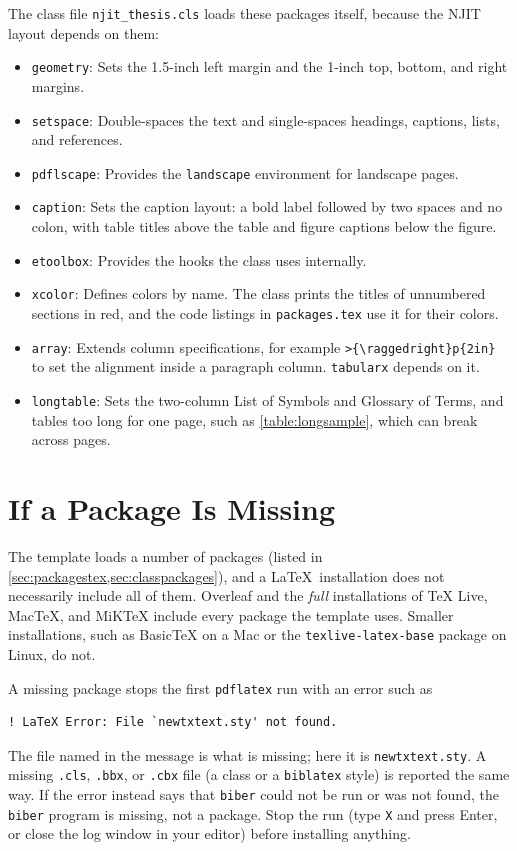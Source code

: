 The class file \texttt{njit\_thesis.cls} loads these packages itself, because the NJIT layout depends on them:
\begin{itemize}
\item \texttt{geometry}: Sets the 1.5-inch left margin and the 1-inch top, bottom, and right margins.
\item \texttt{setspace}: Double-spaces the text and single-spaces headings, captions, lists, and references.
\item \texttt{pdflscape}: Provides the \texttt{landscape} environment for landscape pages.
\item \texttt{caption}: Sets the caption layout: a bold label followed by two spaces and no colon, with table titles above the table and figure captions below the figure.
\item \texttt{etoolbox}: Provides the hooks the class uses internally.
\item \texttt{xcolor}: Defines colors by name. The class prints the titles of unnumbered sections in red, and the code listings in \texttt{packages.tex} use it for their colors.
\item \texttt{array}: Extends column specifications, for example \verb+>{\raggedright}p{2in}+ to set the alignment inside a paragraph column. \texttt{tabularx} depends on it.
\item \texttt{longtable}: Sets the two-column List of Symbols and Glossary of Terms, and tables too long for one page, such as \cref{table:longsample}, which can break across pages.
\end{itemize}

\section{If a Package Is Missing}
\label{sec:missingpackages}
The template loads a number of packages (listed in \cref{sec:packagestex,sec:classpackages}), and a \LaTeX\ installation does not necessarily include all of them. Overleaf and the \emph{full} installations of TeX Live, MacTeX, and MiKTeX include every package the template uses. Smaller installations, such as BasicTeX on a Mac or the \texttt{texlive-latex-base} package on Linux, do not.

A missing package stops the first \texttt{pdflatex} run with an error such as
\begin{verbatim}
! LaTeX Error: File `newtxtext.sty' not found.
\end{verbatim}
The file named in the message is what is missing; here it is \texttt{newtxtext.sty}. A missing \texttt{.cls}, \texttt{.bbx}, or \texttt{.cbx} file (a class or a \texttt{biblatex} style) is reported the same way. If the error instead says that \texttt{biber} could not be run or was not found, the \texttt{biber} program is missing, not a package. Stop the run (type \texttt{X} and press Enter, or close the log window in your editor) before installing anything.

